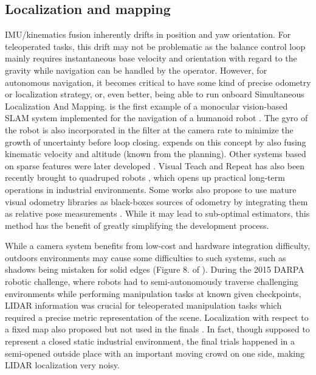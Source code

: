 \subsection{Localization and mapping}
IMU/kinematics fusion inherently drifts in position and yaw orientation. For teleoperated tasks, this drift may not be problematic as the balance control loop
mainly requires instantaneous base velocity and orientation with regard to the gravity while navigation can be handled by the operator. However, for autonomous
navigation, it becomes critical to have some kind of precise odometry or localization strategy, or, even better, being able to run onboard Simultaneous Localization And Mapping. 
\cite{davison2007monoslam} is the first example of a monocular vision-based SLAM system implemented for the navigation of a humanoid robot . The gyro of the robot
is also incorporated in the filter at the camera rate to minimize the growth of uncertainty before loop closing. \cite{stasse2006real} expends on this concept by also fusing
kinematic velocity and altitude (known from the planning). Other systems based on sparse features were later developed \cite{ahn2012board, oriolo2012vision, oriolo2016humanoid, kwak20093d}. 
Visual Teach and Repeat \cite{furgale2010visual} has also been recently brought to quadruped 
robots \cite{mattamala2021learning, mattamala2022efficient}, which opens up practical long-term operations in industrial environments. Some works also propose to use mature visual odometry libraries
as black-boxes sources of odometry by integrating them as relative pose measurements \cite{hartley2018legged,hartley2018hybrid}. While it may lead to sub-optimal estimators, 
this method has the benefit of greatly simplifying the development process.

While a camera system benefits from low-cost and hardware integration difficulty, outdoors environments 
may cause some difficulties to such systems, such as shadows being mistaken for solid edges (Figure 8. of \cite{fallon2014drift}).
During the 2015 DARPA robotic challenge, where robots had to semi-autonomously traverse challenging environments while performing manipulation tasks at known given checkpoints,  
LIDAR information was crucial for teleoperated manipulation tasks \cite{koolen2016design} which required a precise metric representation of the scene. 
Localization with respect to a fixed map also proposed \cite{fallon2014drift} but not used in the finals \cite{fallon2016perception}. In fact, though supposed 
to represent a closed static industrial environment, the final trials happened in a semi-opened outside place with an important moving crowd on one side, making
LIDAR localization very noisy. 

